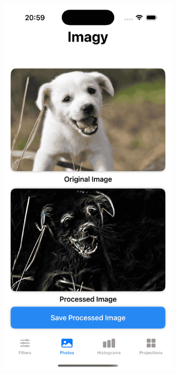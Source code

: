 \documentclass[a4paper]{article}
\begin{document}
\begin{figure}[H]
    \centering
    \begin{subfigure}{0.2\textwidth}
        \centering
        \includegraphics[width=\linewidth]{images/dog_sobel.png}

\end{subfigure}
\end{figure}
\end{document}
